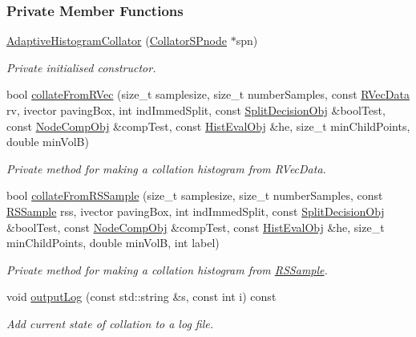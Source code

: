 \subsubsection*{\-Private \-Member \-Functions}
\begin{DoxyCompactItemize}
\item 
\hyperlink{classsubpavings_1_1AdaptiveHistogramCollator_aa088409e6777f2364f4e096faf309e56}{\-Adaptive\-Histogram\-Collator} (\hyperlink{classsubpavings_1_1CollatorSPnode}{\-Collator\-S\-Pnode} $\ast$spn)
\begin{DoxyCompactList}\small\item\em \-Private initialised constructor. \end{DoxyCompactList}\item 
bool \hyperlink{classsubpavings_1_1AdaptiveHistogramCollator_a31596539864bb359dbe1246fdebf3cb6}{collate\-From\-R\-Vec} (size\-\_\-t samplesize, size\-\_\-t number\-Samples, const \hyperlink{namespacesubpavings_a30e15e24c8d81a2160d7422ef3c39d68}{\-R\-Vec\-Data} rv, ivector paving\-Box, int ind\-Immed\-Split, const \hyperlink{classsubpavings_1_1SplitDecisionObj}{\-Split\-Decision\-Obj} \&bool\-Test, const \hyperlink{classsubpavings_1_1NodeCompObj}{\-Node\-Comp\-Obj} \&comp\-Test, const \hyperlink{classsubpavings_1_1HistEvalObj}{\-Hist\-Eval\-Obj} \&he, size\-\_\-t min\-Child\-Points, double min\-Vol\-B)
\begin{DoxyCompactList}\small\item\em \-Private method for making a collation histogram from \-R\-Vec\-Data. \end{DoxyCompactList}\item 
bool \hyperlink{classsubpavings_1_1AdaptiveHistogramCollator_ae83b213dd864bca295dd85fd1f63dbaa}{collate\-From\-R\-S\-Sample} (size\-\_\-t samplesize, size\-\_\-t number\-Samples, const \hyperlink{classRSSample}{\-R\-S\-Sample} rss, ivector paving\-Box, int ind\-Immed\-Split, const \hyperlink{classsubpavings_1_1SplitDecisionObj}{\-Split\-Decision\-Obj} \&bool\-Test, const \hyperlink{classsubpavings_1_1NodeCompObj}{\-Node\-Comp\-Obj} \&comp\-Test, const \hyperlink{classsubpavings_1_1HistEvalObj}{\-Hist\-Eval\-Obj} \&he, size\-\_\-t min\-Child\-Points, double min\-Vol\-B, int label)
\begin{DoxyCompactList}\small\item\em \-Private method for making a collation histogram from \hyperlink{classRSSample}{\-R\-S\-Sample}. \end{DoxyCompactList}\item 
void \hyperlink{classsubpavings_1_1AdaptiveHistogramCollator_aad6e5e6bd009ca64209c471c55a8d43e}{output\-Log} (const std\-::string \&s, const int i) const 
\begin{DoxyCompactList}\small\item\em \-Add current state of collation to a log file. \end{DoxyCompactList}\end{DoxyCompactItemize}
